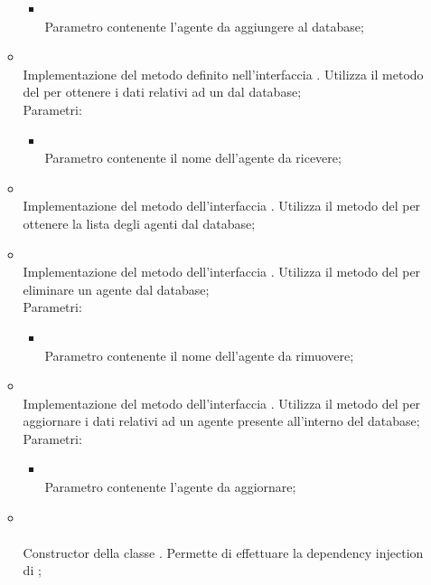 \begin{itemize}
\begin{itemize}
\begin{itemize}
			\item {} \\
			Parametro contenente l'agente da aggiungere al database;
		\end{itemize}
		\item[]  \\		Implementazione del metodo definito nell'interfaccia . Utilizza il metodo  del  per ottenere i dati relativi ad un  dal database;\\
		Parametri:
		\begin{itemize}
			\item {} \\
			Parametro contenente il nome dell'agente da ricevere;
		\end{itemize}
		\item[]  \\		Implementazione del metodo dell'interfaccia . Utilizza il metodo  del  per ottenere la lista degli agenti dal database;\\
		\item[]  \\		Implementazione del metodo dell'interfaccia . Utilizza il metodo  del  per eliminare un agente dal database;\\
		Parametri:
		\begin{itemize}
			\item {} \\
			Parametro contenente il nome dell'agente da rimuovere;
		\end{itemize}
		\item[]  \\		Implementazione del metodo dell'interfaccia . Utilizza il metodo  del  per aggiornare i dati relativi ad un agente presente all'interno del database;\\
		Parametri:
		\begin{itemize}
			\item {} \\
			Parametro contenente l'agente da aggiornare;
		\end{itemize}
		\item[] \\ \\		Constructor della classe . Permette di effettuare la dependency injection di ;\\

\end{itemize}
\end{itemize}
